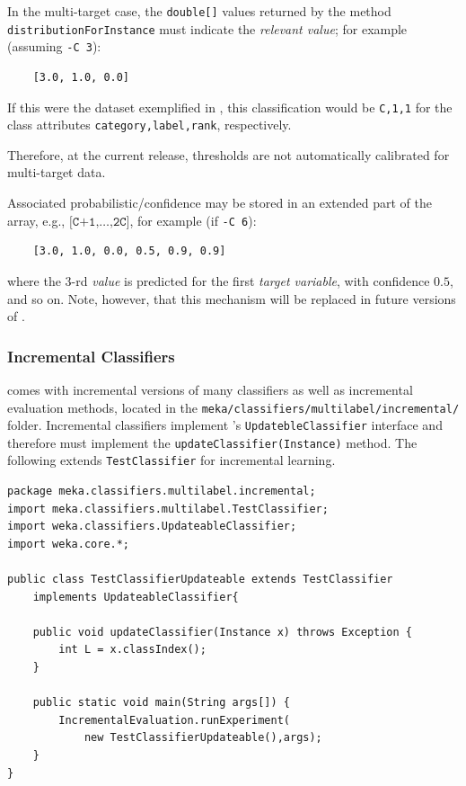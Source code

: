 \documentclass[11pt]{article}
\newcommand{\MEKA}{Meka}
\newcommand{\WEKA}{Weka}
\begin{document}

In the multi-target case, the \texttt{double[]} values returned by the method \texttt{distributionForInstance} must indicate the \emph{relevant value}; for example (assuming \texttt{-C 3}): 
\begin{lstlisting}
	[3.0, 1.0, 0.0]
\end{lstlisting} 
If this were the dataset exemplified in , this classification would be \texttt{C,1,1} for the class attributes \texttt{category,label,rank}, respectively.

Therefore, at the current release, thresholds are not automatically calibrated for multi-target data. 

Associated probabilistic/confidence may be stored in an extended part of the array, e.g., $\texttt{[C+1,\ldots,2C]}$, for example (if \texttt{-C 6}):
\begin{lstlisting}
	[3.0, 1.0, 0.0, 0.5, 0.9, 0.9]
\end{lstlisting} 
where the $3$-rd \emph{value} is predicted for the first \emph{target variable}, with confidence $0.5$, and so on. Note, however, that this mechanism will be replaced in future versions of \framework{\MEKA}.

\subsubsection{Incremental Classifiers}

\framework{\MEKA} comes with incremental versions of many classifiers as well as incremental evaluation methods, located in the \texttt{meka/classifiers/multilabel/incremental/} folder. Incremental classifiers implement \framework{\WEKA}'s \texttt{UpdatebleClassifier} interface and therefore must implement the \texttt{updateClassifier(Instance)} method. The following extends \texttt{TestClassifier} for incremental learning.

{
\small
\lstset{basicstyle=\small\ttfamily,breaklines=true,language=java,frame=L,xleftmargin=\parindent}
\begin{lstlisting}
package meka.classifiers.multilabel.incremental;
import meka.classifiers.multilabel.TestClassifier;
import weka.classifiers.UpdateableClassifier;
import weka.core.*;

public class TestClassifierUpdateable extends TestClassifier 
    implements UpdateableClassifier{
	
    public void updateClassifier(Instance x) throws Exception {
        int L = x.classIndex();
    }
    
    public static void main(String args[]) {
        IncrementalEvaluation.runExperiment(
            new TestClassifierUpdateable(),args);
    }
}
\end{lstlisting}
}
\end{document}
